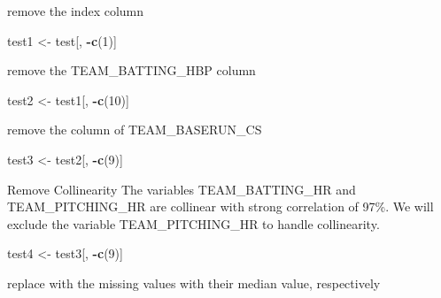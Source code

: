 \documentclass[]{article}
\newenvironment{Shaded}{\begin{snugshade}}{\end{snugshade}}
\newcommand{\KeywordTok}[1]{\textcolor[rgb]{0.13,0.29,0.53}{\textbf{#1}}}
\newcommand{\DecValTok}[1]{\textcolor[rgb]{0.00,0.00,0.81}{#1}}
\newcommand{\StringTok}[1]{\textcolor[rgb]{0.31,0.60,0.02}{#1}}
\newcommand{\OperatorTok}[1]{\textcolor[rgb]{0.81,0.36,0.00}{\textbf{#1}}}
\newcommand{\NormalTok}[1]{#1}
\begin{document}
remove the index column

\begin{Shaded}
\begin{Highlighting}[]
\NormalTok{test1 <-}\StringTok{ }\NormalTok{test[, }\OperatorTok{-}\KeywordTok{c}\NormalTok{(}\DecValTok{1}\NormalTok{)]}
\end{Highlighting}
\end{Shaded}

remove the TEAM\_BATTING\_HBP column

\begin{Shaded}
\begin{Highlighting}[]
\NormalTok{test2 <-}\StringTok{ }\NormalTok{test1[, }\OperatorTok{-}\KeywordTok{c}\NormalTok{(}\DecValTok{10}\NormalTok{)]}
\end{Highlighting}
\end{Shaded}

remove the column of TEAM\_BASERUN\_CS

\begin{Shaded}
\begin{Highlighting}[]
\NormalTok{test3 <-}\StringTok{ }\NormalTok{test2[, }\OperatorTok{-}\KeywordTok{c}\NormalTok{(}\DecValTok{9}\NormalTok{)]}
\end{Highlighting}
\end{Shaded}

Remove Collinearity The variables TEAM\_BATTING\_HR and
TEAM\_PITCHING\_HR are collinear with strong correlation of 97\%. We
will exclude the variable TEAM\_PITCHING\_HR to handle collinearity.

\begin{Shaded}
\begin{Highlighting}[]
\NormalTok{test4 <-}\StringTok{ }\NormalTok{test3[, }\OperatorTok{-}\KeywordTok{c}\NormalTok{(}\DecValTok{9}\NormalTok{)]}
\end{Highlighting}
\end{Shaded}

replace with the missing values with their median value, respectively
\end{document}
